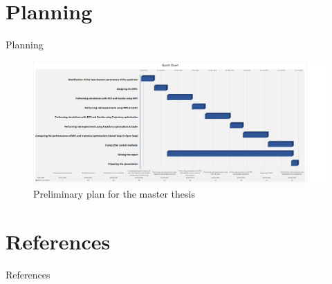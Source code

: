 \documentclass{thesisbeamer}
\begin{document}
\section{Planning}


\begin{frame}[t]{Planning} \vspace{4pt}

\begin{figure}
\centering
\includegraphics[width=\textwidth]{Images/Planning/Gantt Chart}
\caption{Preliminary plan for the master thesis}
\end{figure}




\end{frame}




\section{References}

\begin{frame}[t,allowframebreaks]{References} \vspace{4pt}

\printbibliography

\end{frame}
\end{document}
